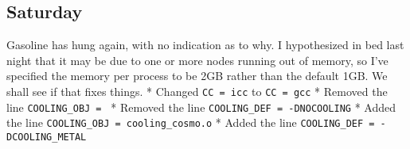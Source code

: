 \documentclass[11pt,letterpaper]{article}
\begin{document}
\subsection{Saturday}

Gasoline has hung again, with no indication as to why. I hypothesized in
bed last night that it may be due to one or more nodes running out of
memory, so I've specified the memory per process to be 2GB rather than
the default 1GB. We shall see if that fixes things. * Changed
\verb!CC = icc! to \verb!CC = gcc! * Removed the line
\verb!COOLING_OBJ = ! * Removed the line
\verb!COOLING_DEF = -DNOCOOLING! * Added the line
\verb!COOLING_OBJ = cooling_cosmo.o! * Added the line
\verb!COOLING_DEF = -DCOOLING_METAL!
\end{document}
